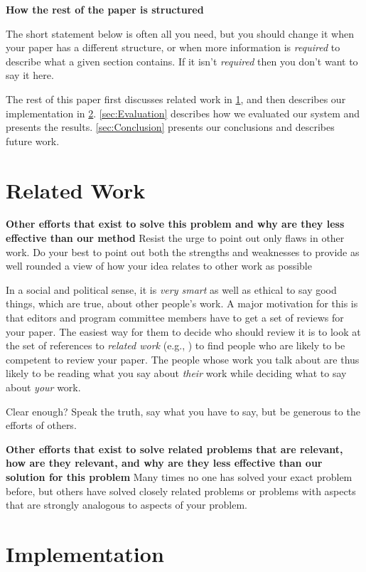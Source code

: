 \documentclass[pdf,bookmarks,colorlinks=true]{IEEEtran}
\begin{document}
\textbf{How the rest of the paper is structured}

The short statement below is often all you need, but you should change it when your paper has a different structure, or when more information is {\em required} to describe what a given section contains. If it isn't {\em required} then you don't want to say it here.

The rest of this paper first discusses related work in \ref{sec:RelatedWork}, and then describes our implementation in \ref{sec:Implementation}. \ref{sec:Evaluation} describes how we evaluated our system and presents the results. \ref{sec:Conclusion} presents our conclusions and describes future work.

\section{Related Work}\label{sec:RelatedWork}

\textbf{Other efforts that exist to solve this problem and why are they less effective than our method} Resist the urge to point out only flaws in other work. Do your best to point out both the strengths and weaknesses to provide as well rounded a view of how your idea relates to other work as possible

In a social and political sense, it is {\em very smart} as well as ethical to say good things, which are true, about other people's work. A major motivation for this is that editors and program committee members have to get a set of reviews for your paper. The easiest way for them to decide who should review it is to look at the set of references to {\em related work} (e.g., \cite{Anderson2007,Anderson2009}) to find people who are likely to be competent to review your paper.  The people whose work you talk about are thus likely to be reading what you say about {\em their} work while deciding what to say about {\em your} work.

Clear enough? Speak the truth, say what you have to say, but be generous to the efforts of others.

\textbf{Other efforts that exist to solve related problems that are relevant, how are they relevant, and why are they less effective than our solution for this problem}
Many times no one has solved your exact problem before, but others have solved closely related problems or problems with aspects that are strongly analogous to aspects of your problem.

\section{Implementation}\label{sec:Implementation}
\end{document}
